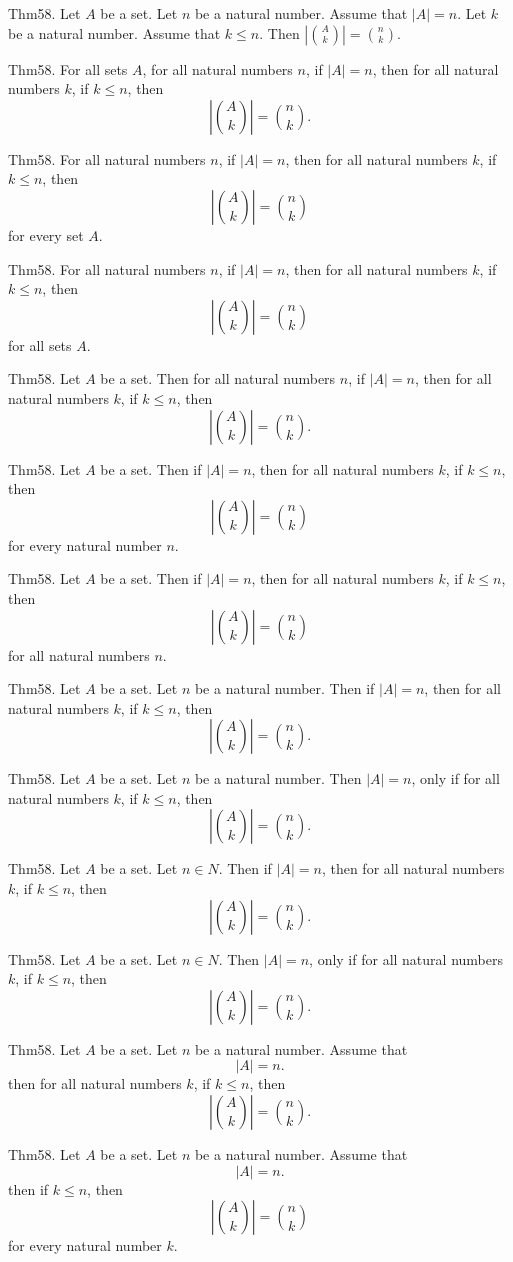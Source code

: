 \documentclass{article}
\begin{document}
Thm58. Let $A$ be a set. Let $n$ be a natural number. Assume that $| A | = n$. Let $k$ be a natural number. Assume that $k \leq n$. Then $| \binom{ A }{ k}| = \binom{ n }{ k}$.

Thm58. For all sets $A$, for all natural numbers $n$, if $| A | = n$, then for all natural numbers $k$, if $k \leq n$, then $$| \binom{ A }{ k}| = \binom{ n }{ k}.$$

Thm58. For all natural numbers $n$, if $| A | = n$, then for all natural numbers $k$, if $k \leq n$, then $$| \binom{ A }{ k}| = \binom{ n }{ k}$$ for every set $A$.

Thm58. For all natural numbers $n$, if $| A | = n$, then for all natural numbers $k$, if $k \leq n$, then $$| \binom{ A }{ k}| = \binom{ n }{ k}$$ for all sets $A$.

Thm58. Let $A$ be a set. Then for all natural numbers $n$, if $| A | = n$, then for all natural numbers $k$, if $k \leq n$, then $$| \binom{ A }{ k}| = \binom{ n }{ k}.$$

Thm58. Let $A$ be a set. Then if $| A | = n$, then for all natural numbers $k$, if $k \leq n$, then $$| \binom{ A }{ k}| = \binom{ n }{ k}$$ for every natural number $n$.

Thm58. Let $A$ be a set. Then if $| A | = n$, then for all natural numbers $k$, if $k \leq n$, then $$| \binom{ A }{ k}| = \binom{ n }{ k}$$ for all natural numbers $n$.

Thm58. Let $A$ be a set. Let $n$ be a natural number. Then if $| A | = n$, then for all natural numbers $k$, if $k \leq n$, then $$| \binom{ A }{ k}| = \binom{ n }{ k}.$$

Thm58. Let $A$ be a set. Let $n$ be a natural number. Then $| A | = n$, only if for all natural numbers $k$, if $k \leq n$, then $$| \binom{ A }{ k}| = \binom{ n }{ k}.$$

Thm58. Let $A$ be a set. Let $n \in N$. Then if $| A | = n$, then for all natural numbers $k$, if $k \leq n$, then $$| \binom{ A }{ k}| = \binom{ n }{ k}.$$

Thm58. Let $A$ be a set. Let $n \in N$. Then $| A | = n$, only if for all natural numbers $k$, if $k \leq n$, then $$| \binom{ A }{ k}| = \binom{ n }{ k}.$$

Thm58. Let $A$ be a set. Let $n$ be a natural number. Assume that $$| A | = n.$$ then for all natural numbers $k$, if $k \leq n$, then $$| \binom{ A }{ k}| = \binom{ n }{ k}.$$

Thm58. Let $A$ be a set. Let $n$ be a natural number. Assume that $$| A | = n.$$ then if $k \leq n$, then $$| \binom{ A }{ k}| = \binom{ n }{ k}$$ for every natural number $k$.
\end{document}
